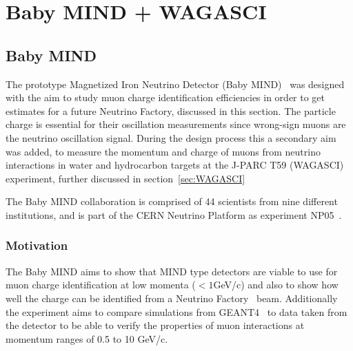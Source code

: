 \chapter{Baby MIND + WAGASCI}
\label{c:WAGASCI}

\section{Baby MIND}


The prototype Magnetized Iron Neutrino Detector (Baby MIND)~\cite{26babyMIND} was designed with the aim to study muon charge identification efficiencies in order to get estimates for a future Neutrino Factory, discussed in this section. The particle charge is essential for their oscillation measurements since wrong-sign muons are the neutrino oscillation signal. During the design process this a secondary aim was added, to measure the momentum and charge of muons from neutrino interactions in water and hydrocarbon targets at the J-PARC T59 (WAGASCI) experiment, further discussed in section~\ref{sec:WAGASCI}

The Baby MIND collaboration is comprised of 44 scientists from nine different institutions, and is part of the CERN Neutrino Platform as experiment NP05~\cite{Fix2}.

\subsection{Motivation}

The Baby MIND aims to show that MIND type detectors are viable to use for muon charge identification at low momenta ($<1$GeV/c) and also to show how well the charge can be identified from a Neutrino Factory~\cite{25NUfact} beam. Additionally the experiment aims to compare simulations from GEANT4~\cite{Geant4} to data taken from the detector to be able to verify the properties of muon interactions at momentum ranges of 0.5 to 10 GeV/c.

